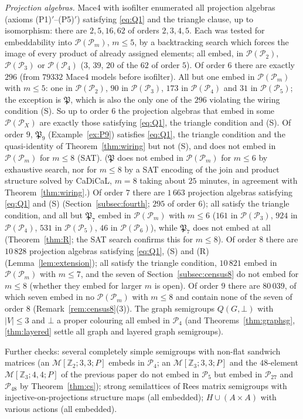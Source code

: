\documentclass[11pt]{amsart}
\theoremstyle{definition}
\renewcommand{\P}{\mathcal{P}}
\newcommand{\Z}{\mathbb{Z}}
\begin{document}
\emph{Projection algebras.} Mace4 with isofilter enumerated all projection algebras (axioms (P1)$'$--(P5)$'$) satisfying \eqref{eq:Q1} and the triangle clause, up to isomorphism: there are $2,5,16,62$ of orders $2,3,4,5$. Each was tested for embeddability into $\P(\P_m)$, $m\le5$, by a backtracking search which forces the image of every product of already assigned elements; all embed, in $\P(\P_2)$, $\P(\P_3)$ or $\P(\P_4)$ ($3$, $39$, $20$ of the $62$ of order $5$). Of order $6$ there are exactly $296$ (from $79332$ Mace4 models before isofilter). All but one embed in $\P(\P_m)$ with $m\le5$: one in $\P(\P_2)$, $90$ in $\P(\P_3)$, $173$ in $\P(\P_4)$ and $31$ in $\P(\P_5)$; the exception is $\mathfrak P$, which is also the only one of the $296$ violating the wiring condition (S). So up to order $6$ the projection algebras that embed in some $\P(\P_X)$ are exactly those satisfying \eqref{eq:Q1}, the triangle condition and (S). Of order $9$, $\mathfrak P_9$ (Example~\ref{ex:P9}) satisfies \eqref{eq:Q1}, the triangle condition and the quasi-identity of Theorem~\ref{thm:wiring} but not (S), and does not embed in $\P(\P_m)$ for $m\le8$ (SAT). ($\mathfrak P$ does not embed in $\P(\P_m)$ for $m\le6$ by exhaustive search, nor for $m\le8$ by a SAT encoding of the join and product structure solved by CaDiCaL, $m=8$ taking about $25$ minutes, in agreement with Theorem~\ref{thm:wiring}.) Of order $7$ there are $1\,663$ projection algebras satisfying \eqref{eq:Q1} and (S) (Section~\ref{subsec:fourth}; $295$ of order $6$); all satisfy the triangle condition, and all but $\mathfrak P_7$ embed in $\P(\P_m)$ with $m\le6$ ($161$ in $\P(\P_3)$, $924$ in $\P(\P_4)$, $531$ in $\P(\P_5)$, $46$ in $\P(\P_6)$), while $\mathfrak P_7$ does not embed at all (Theorem~\ref{thm:R}; the SAT search confirms this for $m\le8$). Of order $8$ there are $10\,828$ projection algebras satisfying \eqref{eq:Q1}, (S) and (R) (Lemma~\ref{lem:extension}); all satisfy the triangle condition, $10\,821$ embed in $\P(\P_m)$ with $m\le7$, and the seven of Section~\ref{subsec:census8} do not embed for $m\le8$ (whether they embed for larger $m$ is open). Of order $9$ there are $80\,039$, of which seven embed in no $\P(\P_m)$ with $m\le8$ and contain none of the seven of order $8$ (Remark~\ref{rem:census8}(3)). The graph semigroups $Q(G,\bot)$ with $|V|\le3$ and $\bot$ a proper colouring all embed in $\P_4$ (and Theorems~\ref{thm:graphsg}, \ref{thm:layered} settle all graph and layered graph semigroups).

Further checks: several completely simple semigroups with non-flat sandwich matrices (an $\mathcal M[\Z_2;3,3;P]$ embeds in $\P_4$; an $\mathcal M[\Z_3;3,3;P]$ and the $48$-element $\mathcal M[\Z_3;4,4;P]$ of the previous paper do not embed in $\P_5$ but embed in $\P_{27}$ and $\P_{48}$ by Theorem~\ref{thm:cs}); strong semilattices of Rees matrix semigroups with injective-on-projections structure maps (all embedded); $H\cup(A\times A)$ with various actions (all embedded).
\end{document}
